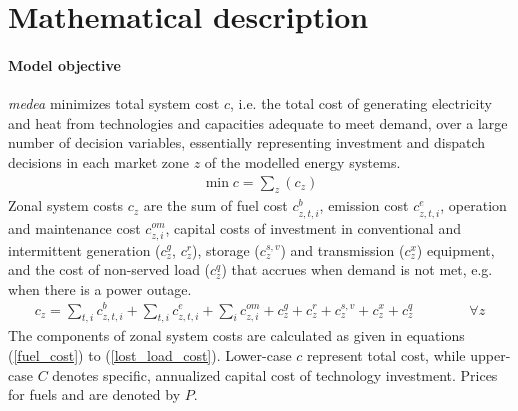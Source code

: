 \documentclass[11pt,a4paper]{article}
\begin{document}
\newpage
\section{Mathematical description} \label{mathmodel}

\paragraph{Model objective}
\emph{medea} minimizes total system cost $c$, i.e. the total cost of generating electricity and heat from technologies and capacities adequate to meet demand, over a large number  of decision variables, essentially representing investment and dispatch decisions in each market zone $z$ of the modelled energy systems.
\begin{align}
\min c = \sum_{z} (c_{z})
\end{align}
Zonal system costs $c_{z}$ are the sum of fuel cost $c^{b}_{z,t,i}$, emission cost $c^{e}_{z,t,i}$, operation and maintenance cost $c^{om}_{z,i}$, capital costs of investment in conventional and intermittent generation ($c^{g}_{z}$, $c^{r}_{z}$), storage ($c^{s,v}_{z}$) and transmission ($c^{x}_{z}$) equipment, and the cost of non-served load ($c^{q}_{z}$) that accrues when demand is not met, e.g. when there is a power outage. 
\begin{align}
c_{z} = \sum_{t,i}  c^{b}_{z,t,i} + \sum_{t,i} c^{e}_{z,t,i} + \sum_{i} c^{om}_{z,i} + c^{g}_{z} + 
 c^{r}_{z} + c^{s,v}_{z} + c^{x}_{z} + c^{q}_{z} \qquad \qquad \forall z
\end{align}
The components of zonal system costs are calculated as given in equations (\ref{fuel_cost}) to (\ref{lost_load_cost}).
Lower-case $c$ represent total cost, while upper-case $C$ denotes specific, annualized capital cost of technology investment. Prices for fuels and  are denoted by $P$.
\end{document}
